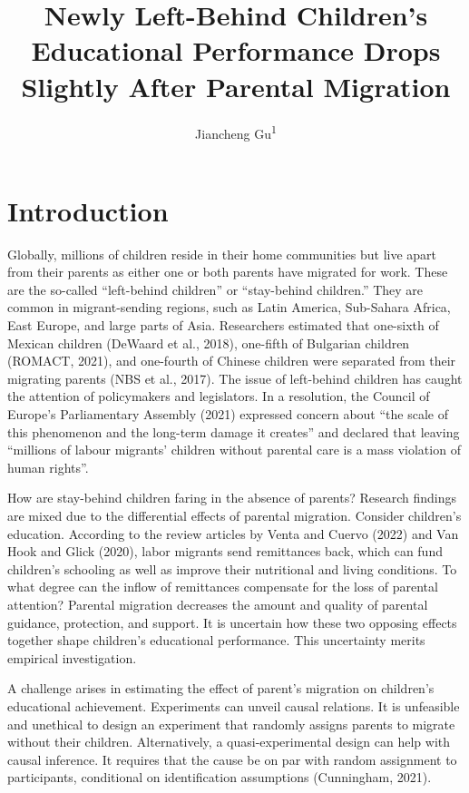 \documentclass[
  man,floatsintext]{apa7}
\title{Newly Left-Behind Children's Educational Performance Drops Slightly After Parental Migration}
\author{Jiancheng Gu\textsuperscript{1}}
\date{}
\affiliation{\vspace{0.5cm}\textsuperscript{1} Faculty of Social Sciences, Vrije Universiteit Amsterdam}
\begin{document}
\maketitle

\hypertarget{introduction}{%
\section{Introduction}\label{introduction}}

Globally, millions of children reside in their home communities but live apart from their parents as either one or both parents have migrated for work. These are the so-called ``left-behind children'' or ``stay-behind children.'' They are common in migrant-sending regions, such as Latin America, Sub-Sahara Africa, East Europe, and large parts of Asia. Researchers estimated that one-sixth of Mexican children (DeWaard et al., 2018), one-fifth of Bulgarian children (ROMACT, 2021), and one-fourth of Chinese children were separated from their migrating parents (NBS et al., 2017). The issue of left-behind children has caught the attention of policymakers and legislators. In a resolution, the Council of Europe's Parliamentary Assembly (2021) expressed concern about ``the scale of this phenomenon and the long-term damage it creates'' and declared that leaving ``millions of labour migrants' children without parental care is a mass violation of human rights''.

How are stay-behind children faring in the absence of parents? Research findings are mixed due to the differential effects of parental migration. Consider children's education. According to the review articles by Venta and Cuervo (2022) and Van Hook and Glick (2020), labor migrants send remittances back, which can fund children's schooling as well as improve their nutritional and living conditions. To what degree can the inflow of remittances compensate for the loss of parental attention? Parental migration decreases the amount and quality of parental guidance, protection, and support. It is uncertain how these two opposing effects together shape children's educational performance. This uncertainty merits empirical investigation.

A challenge arises in estimating the effect of parent's migration on children's educational achievement. Experiments can unveil causal relations. It is unfeasible and unethical to design an experiment that randomly assigns parents to migrate without their children. Alternatively, a quasi-experimental design can help with causal inference. It requires that the cause be on par with random assignment to participants, conditional on identification assumptions (Cunningham, 2021).
\end{document}
